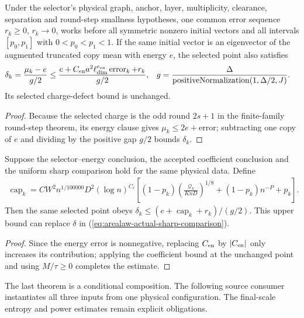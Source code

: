 \begin{lemma}
    \label{thm:arealaw-actual-selected-energy}
    \leanok
    Under the selector's physical graph, anchor, layer,
    multiplicity, clearance, separation and round-step smallness
    hypotheses, one common error sequence $r_k\ge0$, $r_k\to0$, works
    before all symmetric nonzero initial vectors and all
    intervals $[p_0,p_1]$ with $0<p_0<p_1<1$. If the same initial vector is an
    eigenvector of the augmented truncated copy mean with energy $e$,
    the selected point also satisfies
    \begin{align}
        \delta_k=\frac{\mu_k-e}{g/2}
                                          & \le\frac{e+C_{\rm en}a^2\ell_{\dim}^{e_{\rm en}}
        \operatorname{error}_k+r_k}{g/2}, &
        g                                 & =\frac\Delta{\operatorname{positiveNormalization}(1,\Delta/2,J)}.
        \label{eq:arealaw-selected-actual-energy}
    \end{align}
    Its selected charge-defect bound is unchanged.
\end{lemma}
\begin{proof}
    \leanok
    Because the selected charge is the odd round $2s+1$ in the finite-family
    round-step theorem, its energy clause gives $\mu_k\le2e+$error;
    subtracting one copy of $e$ and dividing by the positive gap $g/2$ bounds $\delta_k$.
\end{proof}

\begin{lemma}
    \label{thm:arealaw-selected-sharp-composition}
    \leanok
    Suppose the selector--energy conclusion, the accepted coefficient
    conclusion and the uniform sharp comparison hold for the
    same physical data. Define
    \begin{align}
        \operatorname{cap}_k
        =CW^2n^{1/100000}D^2(\log n)^{C_\ell}
        \left[(1-p_k)\left(\frac{\mathcal Q_k}{KnD}\right)^{1/8}
            +(1-p_k)n^{-P}+p_k\right].
        \label{eq:arealaw-selected-sharp-density-cap}
    \end{align}
    Then the same selected point obeys
    $\delta_k\le(e+\operatorname{cap}_k+r_k)/(g/2)$.
    This upper bound can replace $\delta$ in
    (\ref{eq:arealaw-actual-sharp-comparison}).
\end{lemma}
\begin{proof}
    \leanok
    Since the energy error is nonnegative, replacing $C_{\rm en}$
    by $|C_{\rm en}|$ only increases its contribution; applying the
    coefficient bound at the unchanged point and using $M/\tau\ge0$ completes the estimate.
\end{proof}

The last theorem is a conditional composition. The following source
consumer instantiates all three inputs from one physical configuration.
The final-scale entropy and power estimates remain explicit obligations.
